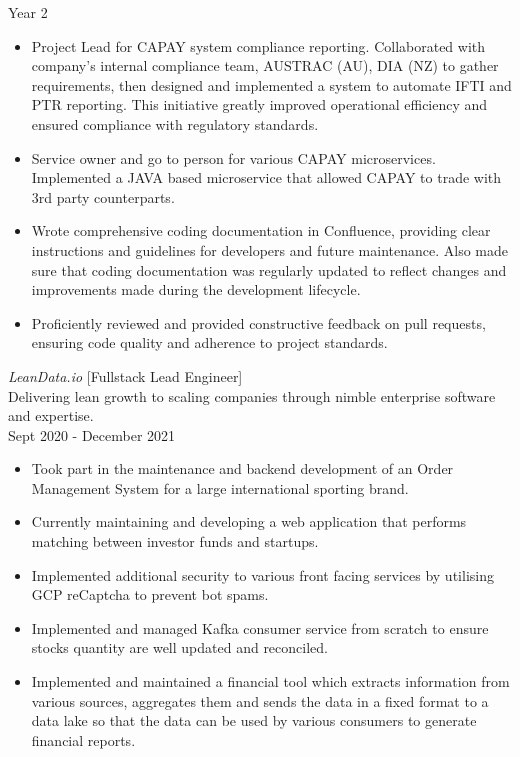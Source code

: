 \documentclass[10pt, a4paper]{cv}
\begin{document}
\begin{paracol}{2}
\begin{flushleft}
\begin{itemize}[ topsep=0pt]
		\end{itemize}
		\vspace{6pt}
		\quad Year 2
		\begin{itemize}[ topsep=0pt]  \itemsep -2pt
			\item Project Lead for CAPAY system compliance reporting. Collaborated with company's internal compliance team, AUSTRAC (AU), DIA (NZ) to gather requirements, then designed and implemented a system to automate IFTI and PTR reporting.  This initiative greatly improved operational efficiency and ensured compliance with regulatory standards.
			\item Service owner and go to person for various CAPAY microservices. Implemented a JAVA based microservice that allowed CAPAY to trade with 3rd party counterparts.
			\item Wrote comprehensive coding documentation in Confluence, providing clear instructions and guidelines for developers and future maintenance. Also made sure that coding documentation was regularly updated to reflect changes and improvements made during the development lifecycle.
			\item Proficiently reviewed and provided constructive feedback on pull requests, ensuring code quality and adherence to project standards.
		\end{itemize}
		\switchcolumn
		\vspace{43pt}
		{\sl LeanData.io } [Fullstack Lead Engineer] \\
		Delivering lean growth to scaling companies through nimble enterprise software and expertise.\\
		Sept 2020 - December 2021
		\begin{itemize} \itemsep -2pt
			\item Took part in the maintenance and backend development of an Order Management System for a large international sporting brand.
			\item Currently maintaining and developing a web application that performs matching between investor funds and startups.
			\item Implemented additional security to various front facing services by utilising GCP reCaptcha to prevent bot spams.
			\item Implemented and managed Kafka consumer service from scratch to ensure stocks quantity are well updated and reconciled.
			\item Implemented and maintained a financial tool which extracts information from various sources, aggregates them and sends the data in a fixed format to a data lake so that the data can be used by various consumers to generate financial reports.

\end{itemize}
\end{flushleft}
\end{paracol}
\end{document}
